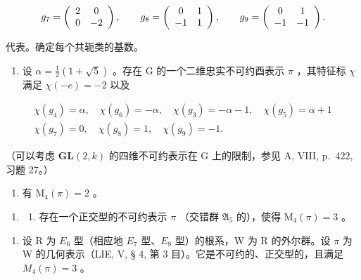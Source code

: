 \[
g _ {7} = \left( \begin{array}{c c} 2 & 0 \\ 0 & - 2 \end{array} \right), \qquad g _ {8} = \left( \begin{array}{c c} 0 & 1 \\ - 1 & 1 \end{array} \right), \qquad g _ {9} = \left( \begin{array}{c c} 0 & 1 \\ - 1 & - 1 \end{array} \right).
\]

代表。确定每个共轭类的基数。

\begin{enumerate}
\def\labelenumi{\alph{enumi})}
\setcounter{enumi}{1}
\tightlist
\item
  设 \(\alpha = \frac{1}{2}(1 + \sqrt{5})\) 。存在 G 的一个二维忠实不可约酉表示 \(\pi\) ，其特征标 \(\chi\) 满足 \(\chi(-e) = -2\) 以及
\end{enumerate}

\[
\begin{array}{c} \chi (g _ {4}) = \alpha , \quad \chi (g _ {6}) = - \alpha , \quad \chi (g _ {3}) = - \alpha - 1, \quad \chi (g _ {5}) = \alpha + 1 \\ \chi (g _ {7}) = 0, \quad \chi (g _ {8}) = 1, \quad \chi (g _ {9}) = - 1. \end{array}
\]

（可以考虑 \(\mathbf{GL}(2,k)\) 的四维不可约表示在 G 上的限制，参见 A, VIII, p.~422, 习题 27。）

\begin{enumerate}
\def\labelenumi{\alph{enumi})}
\setcounter{enumi}{2}
\tightlist
\item
  有 \(\mathrm{M}_4(\pi) = 2\) 。
\end{enumerate}

\begin{enumerate}
\def\labelenumi{\arabic{enumi})}
\setcounter{enumi}{9}
\tightlist
\item
  \begin{enumerate}
  \def\labelenumii{\alph{enumii})}
  \tightlist
  \item
    存在一个正交型的不可约表示 \(\pi\) （交错群 \(\mathfrak{A}_5\) 的），使得 \(\mathrm{M}_4(\pi) = 3\) 。
  \end{enumerate}
\end{enumerate}

\begin{enumerate}
\def\labelenumi{\alph{enumi})}
\setcounter{enumi}{1}
\tightlist
\item
  设 R 为 \(E_{6}\) 型（相应地 \(E_{7}\) 型、\(E_{8}\) 型）的根系，W 为 R 的外尔群。设 \(\pi\) 为 W 的几何表示（LIE, V, § 4, 第 3 目）。它是不可约的、正交型的，且满足 \(M_{4}(\pi)=3\) 。
\end{enumerate}

